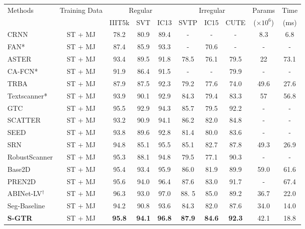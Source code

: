 \documentclass[letterpaper]{article} \usepackage{aaai22}  \usepackage{times}  \usepackage{helvet}  \usepackage{courier}  \usepackage[hyphens]{url}  \usepackage{graphicx} \urlstyle{rm} \def\UrlFont{\rm}  \usepackage{natbib}  \usepackage{caption} \DeclareCaptionStyle{ruled}{labelfont=normalfont,labelsep=colon,strut=off} \frenchspacing  \setlength{\pdfpagewidth}{8.5in}  \setlength{\pdfpageheight}{11in}
\newcommand{\bt}{\color{black}}
\begin{document}
\begin{table*}[t]
	\footnotesize
	\centering
	\begin{tabular}{l|c|c|c|c|c|c|c|c|c}
		\hline
		\multirow{2}{*}{Methods} & \multirow{2}{*}{Training Data}   & \multicolumn{3}{c}{Regular} & \multicolumn{3}{|c|}{Irregular} & \multirow{1}{*}{Params} &\multirow{1}{*}{Time}  \\
\cline{3-8}
		&  &IIIT5k & SVT  & IC13 & SVTP & IC15 &CUTE & ($\times 10^{6}$) & (ms)  \\
\hline
		CRNN \cite{shi2016end} &ST + MJ & 78.2 & 80.9 & 89.4 & -	 &-	  & - & 8.3  & 6.8\\
		FAN* \cite{cheng2017focusing} & ST + MJ  & 87.4 & 85.9 & 93.3 & -  & 70.6 & -  & - & - \\ 
		ASTER \cite{shi2018aster}& ST + MJ  & 93.4 & 89.5 & 91.8 & 78.5 & 76.1 & 79.5 & 22 & 73.1\\
		CA-FCN* \cite{liao2019scene}& ST + MJ & 91.9 & 86.4 & 91.5 & -  & - & 79.9 & -&-\\
		TRBA \cite{baek2019wrong} &ST + MJ & 87.9 & 87.5 & 92.3 & 79.2 &77.6  & 74.0 &49.6 &27.6\\
		Textscanner* \cite{wan2020textscanner}  & ST + MJ &93.9	&90.1 &92.9 &84.3 &79.4 &83.3& 57   & 56.8\\  
		GTC \cite{hu2020gtc}&ST + MJ & 95.5 & 92.9 & 94.3 & 85.7 &  79.5 & 92.2 &- &-\\
		SCATTER \cite{litman2020scatter} &ST + MJ &93.2 &90.9 &94.1 &86.2 &82.0 &84.8 &- & - \\
		SEED \cite{qiao2020seed} &ST + MJ &93.8 &89.6 &92.8 &81.4 &80.0 &83.6&- &- \\
		SRN \cite{yu2020towards}& ST + MJ & 94.8 & 85.1 & 95.5 & 85.1 & 82.7 & 87.8 & 49.3 & 26.9\\
		RobustScanner \cite{yue2020robustscanner} &ST + MJ  &95.3&88.1&94.8& 79.5 &77.1 &90.3 &-&-\\
		Base2D \cite{yan2021primitive} & ST + MJ &95.4 &93.4 &95.9 &86.0 &81.9 & 89.9 & 59.0 &61.6 \\ 
		PREN2D \cite{yan2021primitive} &ST + MJ  &95.6 &94.0 &96.4 &87.6 &83.0 & 91.7 & - &67.4 \\
\bt ABINet-LV$^\dag$ \cite{fang2021read}  &ST + MJ   &96.3   & 93.0  & 97.0  & 88. 5   & 85.0  & 89.2   & 36.7 & 22.0\\
		\hline
		Seg-Baseline &ST + MJ  &94.2	&90.8 &93.6	&84.3 &82.0 &87.6 & 34.0 & 14.0\\
		\textbf{S-GTR}         &ST + MJ  &\bf{95.8} & \bf{94.1} & \bf{96.8} &\bf{87.9}	&\bf{84.6}	& \bf{92.3} &42.1 & 18.8\\ 

\end{tabular}
\end{table*}
\end{document}
